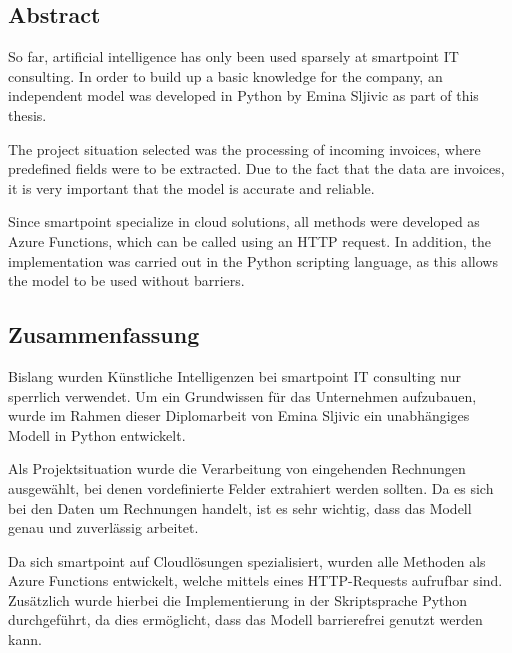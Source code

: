 \begin{spacing}{1}
    \chapter*{Abstract}
\end{spacing}
So far, artificial intelligence has only been used sparsely at smartpoint IT consulting. In order to build up a basic knowledge for the company, an independent model was developed in Python by Emina Sljivic as part of this thesis.

The project situation selected was the processing of incoming invoices, where predefined fields were to be extracted. Due to the fact that the data are invoices, it is very important that the model is accurate and reliable.

Since smartpoint specialize in cloud solutions, all methods were developed as Azure Functions, which can be called using an HTTP request. In addition, the implementation was carried out in the Python scripting language, as this allows the model to be used without barriers.
\newpage
\begin{spacing}{1}
    \chapter*{Zusammenfassung}
\end{spacing}
Bislang wurden Künstliche Intelligenzen bei smartpoint IT consulting nur sperrlich verwendet. Um ein Grundwissen für das Unternehmen aufzubauen, wurde im Rahmen dieser Diplomarbeit von Emina Sljivic ein unabhängiges Modell in Python entwickelt.

Als Projektsituation wurde die Verarbeitung von eingehenden Rechnungen ausgewählt, bei denen vordefinierte Felder extrahiert werden sollten. Da es sich bei den Daten um Rechnungen handelt, ist es sehr wichtig, dass das Modell genau und zuverlässig arbeitet.

Da sich smartpoint auf Cloudlösungen spezialisiert, wurden alle Methoden als Azure Functions entwickelt, welche mittels eines HTTP-Requests aufrufbar sind. Zusätzlich wurde hierbei die Implementierung in der Skriptsprache Python durchgeführt, da dies ermöglicht, dass das Modell barrierefrei genutzt werden kann.


